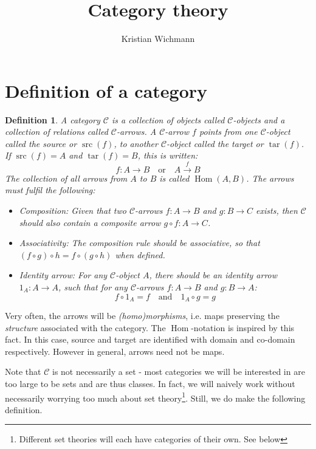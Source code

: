\documentclass[12pt, a4paper]{article}
\title{Category theory}
\author{Kristian Wichmann}
\newtheorem{definition}{Definition}[section]
\numberwithin{equation}{section}
\DeclareMathOperator{\src}{src}
\DeclareMathOperator{\tar}{tar}
\DeclareMathOperator{\Hom}{Hom}
\begin{document}
\maketitle

\section{Definition of a category}
\begin{definition}
A category $\mathcal{C}$ is a collection of objects called $\mathcal{C}$-objects and a collection of relations called $\mathcal{C}$-arrows. A $\mathcal{C}$-arrow $f$ points from one $\mathcal{C}$-object called the source or $\src(f)$, to another $\mathcal{C}$-object called the target or $\tar(f)$. If $\src(f)=A$ and $\tar(f)=B$, this is written:
\begin{equation}
f: A\rightarrow B\quad\textrm{or}\quad A\xrightarrow{f}B
\end{equation}
The collection of all arrows from $A$ to $B$ is called $\Hom(A,B)$. The arrows must fulfil the following:
\begin{itemize}
\item Composition: Given that two $\mathcal{C}$-arrows $f: A\rightarrow B$ and $g:B\rightarrow C$ exists, then $\mathcal{C}$ should also contain a composite arrow $g\circ f: A\rightarrow C$.
\item Associativity: The composition rule should be associative, so that $(f\circ g)\circ h=f\circ(g\circ h)$ when defined.
\item Identity arrow: For any $\mathcal{C}$-object $A$, there should be an identity arrow $1_A: A\rightarrow A$, such that for any $\mathcal{C}$-arrows $f: A\rightarrow B$ and $g: B\rightarrow A$:
\begin{equation}
f\circ 1_A=f\quad\textrm{and}\quad 1_A\circ g=g
\end{equation}
\end{itemize}
\end{definition}

Very often, the arrows will be \textit{(homo)morphisms}, i.e. maps preserving the \textit{structure} associated with the category. The $\Hom$-notation is inspired by this fact. In this case, source and target are identified with domain and co-domain respectively. However in general, arrows need not be maps.

Note that $\mathcal{C}$ is not necessarily a set - most categories we will be interested in are too large to be sets and are thus classes. In fact, we will naively work without necessarily worrying too much about set theory\footnote{Different set theories will each have categories of their own. See below}. Still, we do make the following definition.
\end{document}
